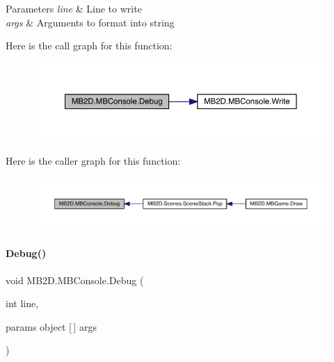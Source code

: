 \begin{DoxyParams}{Parameters}
{\em line} & Line to write\\
\hline
{\em args} & Arguments to format into string\\
\hline
\end{DoxyParams}
Here is the call graph for this function\+:
\nopagebreak
\begin{figure}[H]
\begin{center}
\leavevmode
\includegraphics[width=350pt]{class_m_b2_d_1_1_m_b_console_a6f0c0f179b2fef32a130a5e1d4957a70_cgraph}
\end{center}
\end{figure}
Here is the caller graph for this function\+:
\nopagebreak
\begin{figure}[H]
\begin{center}
\leavevmode
\includegraphics[width=350pt]{class_m_b2_d_1_1_m_b_console_a6f0c0f179b2fef32a130a5e1d4957a70_icgraph}
\end{center}
\end{figure}
\hypertarget{class_m_b2_d_1_1_m_b_console_a1235820bedb1bc0598c863a0d7033329}{}\label{class_m_b2_d_1_1_m_b_console_a1235820bedb1bc0598c863a0d7033329} 
\paragraph{\texorpdfstring{Debug()}{Debug()}\hspace{0.1cm}{\footnotesize\ttfamily [2/4]}}
{\footnotesize\ttfamily void M\+B2\+D.\+M\+B\+Console.\+Debug (\begin{DoxyParamCaption}\item[{int}]{line,  }\item[{params object \mbox{[}$\,$\mbox{]}}]{args }\end{DoxyParamCaption})\hspace{0.3cm}{\ttfamily [inline]}}



